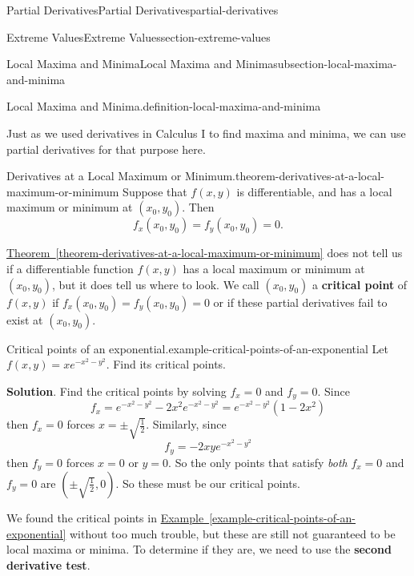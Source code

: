 \documentclass[oneside,10pt,]{book}
\newcommand{\terminology}[1]{\textbf{#1}}
\numberwithin{equation}{section}
\begin{document}
\begin{chapterptx}{Partial Derivatives}{}{Partial Derivatives}{}{}{partial-derivatives}
\begin{sectionptx}{Extreme Values}{}{Extreme Values}{}{}{section-extreme-values}
\begin{subsectionptx}{Local Maxima and Minima}{}{Local Maxima and Minima}{}{}{subsection-local-maxima-and-minima}
\begin{definition}{Local Maxima and Minima.}{definition-local-maxima-and-minima}
\end{definition}
\hypertarget{p-1422}{}%
Just as we used derivatives in Calculus I to find maxima and minima, we can use partial derivatives for that purpose here.%
\begin{theorem}{Derivatives at a Local Maximum or Minimum.}{}{theorem-derivatives-at-a-local-maximum-or-minimum}%
\hypertarget{p-1423}{}%
Suppose that \(f(x,y)\) is differentiable, and has a local maximum or minimum at \((x_{0},y_{0})\). Then%
\begin{equation*}
f_{x}(x_{0},y_{0}) = f_{y}(x_{0},y_{0}) = 0.
\end{equation*}
%
\end{theorem}
\hypertarget{p-1424}{}%
\hyperref[theorem-derivatives-at-a-local-maximum-or-minimum]{Theorem~\ref{theorem-derivatives-at-a-local-maximum-or-minimum}} does not tell us if a differentiable function \(f(x,y)\) has a local maximum or minimum at \((x_{0},y_{0})\), but it does tell us where to look. We call \((x_{0},y_{0})\) a \terminology{critical point} of \(f(x,y)\) if \(f_{x}(x_{0},y_{0}) = f_{y}(x_{0},y_{0}) = 0\) or if these partial derivatives fail to exist at \((x_{0},y_{0})\).%
\begin{example}{Critical points of an exponential.}{example-critical-points-of-an-exponential}%
\hypertarget{p-1425}{}%
Let \(f(x,y) = xe^{-x^{2} - y^{2}}\). Find its critical points.%
\par\smallskip%
\noindent\textbf{Solution}.\hypertarget{solution-231}{}\quad%
\hypertarget{p-1426}{}%
Find the critical points by solving \(f_{x} = 0\) and \(f_{y} = 0\). Since%
\begin{equation*}
f_{x} = e^{-x^{2} - y^{2}} -2x^{2}e^{-x^{2} - y^{2}} = e^{-x^{2} - y^{2}}(1 - 2x^{2})
\end{equation*}
then \(f_{x} = 0\) forces \(x = \pm\sqrt{\frac{1}{2}}\). Similarly, since%
\begin{equation*}
f_{y} = -2xye^{-x^{2} - y^{2}}
\end{equation*}
then \(f_{y} = 0\) forces \(x = 0\) or \(y = 0\). So the only points that satisfy \emph{both} \(f_{x} = 0\) and \(f_{y} = 0\) are \((\pm\sqrt{\frac{1}{2}}, 0).\) So these must be our critical points.%
\end{example}
\hypertarget{p-1427}{}%
We found the critical points in \hyperref[example-critical-points-of-an-exponential]{Example~\ref{example-critical-points-of-an-exponential}} without too much trouble, but these are still not guaranteed to be local maxima or minima. To determine if they are, we need to use the \terminology{second derivative test}.%

\end{subsectionptx}
\end{sectionptx}
\end{chapterptx}
\end{document}
